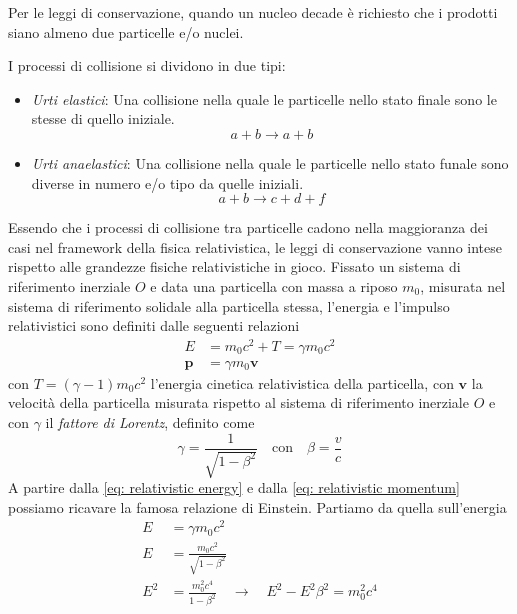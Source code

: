 Per le leggi di conservazione, quando un nucleo decade è richiesto che i prodotti siano almeno due particelle e/o nuclei. 

I processi di collisione si dividono in due tipi:
    \begin{itemize}
        \item \textit{Urti elastici}: Una collisione nella quale le particelle nello stato finale sono le stesse di quello iniziale.
            \begin{equation*}
                a + b \to a + b
            \end{equation*}
        \item \textit{Urti anaelastici}: Una collisione nella quale le particelle nello stato funale sono diverse in numero e/o tipo da quelle iniziali.
            \begin{equation*}
                a + b \to c + d + f
            \end{equation*}
    \end{itemize}
Essendo che i processi di collisione tra particelle cadono nella maggioranza dei casi nel framework della fisica relativistica, le leggi di conservazione vanno intese rispetto alle grandezze fisiche relativistiche in gioco. Fissato un sistema di riferimento inerziale $O$ e data una particella con massa a riposo $m_0$, misurata nel sistema di riferimento solidale alla particella stessa, l'energia e l'impulso relativistici sono definiti dalle seguenti relazioni
    \begin{align}
        E & = m_0 c^2 + T = \gamma m_0 c^2 
        \label{eq: relativistic energy} \\
        \mathbf{p} & = \gamma m_0 \mathbf{v} 
        \label{eq: relativistic momentum}
    \end{align}
con $T = (\gamma - 1) m_0 c^2$ l'energia cinetica relativistica della particella, con $\mathbf{v}$ la velocità della particella misurata rispetto al sistema di riferimento inerziale $O$ e con $\gamma$ il \textit{fattore di Lorentz}, definito come     
    \begin{equation*}
        \gamma = \frac{1}{\sqrt{1 - \beta^2}} \quad \text{con} \quad \beta = \frac{v}{c}
    \end{equation*}
A partire dalla \eqref{eq: relativistic energy} e dalla \eqref{eq: relativistic momentum} possiamo ricavare la famosa relazione di Einstein. Partiamo da quella sull'energia
    \begin{align*}
        E & = \gamma m_0 c^2 \\
        E & = \frac{m_0 c^2}{\sqrt{1 - \beta^2}}  \\
        E^2 & = \frac{m_0^2 c^4}{1 - \beta^2} \quad \to \quad  E^2 - E^2 \beta^2 = m_0^2 c^4
    \end{align*}
